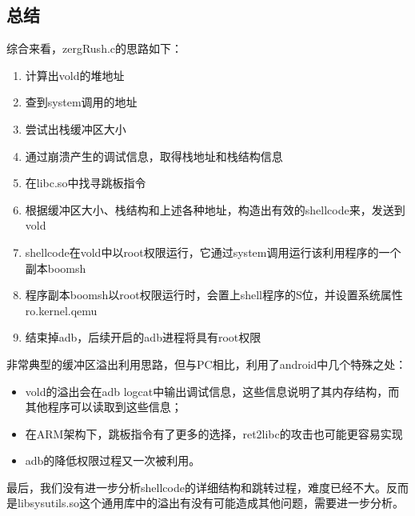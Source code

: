 \subsection{总结}

综合来看，zergRush.c的思路如下：
\begin{enumerate}
\item 计算出vold的堆地址
\item 查到system调用的地址
\item 尝试出栈缓冲区大小
\item 通过崩溃产生的调试信息，取得栈地址和栈结构信息
\item 在libc.so中找寻跳板指令
\item 根据缓冲区大小、栈结构和上述各种地址，构造出有效的shellcode来，发送到vold
\item shellcode在vold中以root权限运行，它通过system调用运行该利用程序的一个副本boomsh
\item 程序副本boomsh以root权限运行时，会置上shell程序的S位，并设置系统属性ro.kernel.qemu
\item 结束掉adb，后续开启的adb进程将具有root权限
\end{enumerate}

非常典型的缓冲区溢出利用思路，但与PC相比，利用了android中几个特殊之处：
\begin{itemize}
\item vold的溢出会在adb logcat中输出调试信息，这些信息说明了其内存结构，而其他程序可以读取到这些信息；
\item 在ARM架构下，跳板指令有了更多的选择，ret2libc的攻击也可能更容易实现
\item adb的降低权限过程又一次被利用。
\end{itemize}

最后，我们没有进一步分析shellcode的详细结构和跳转过程，难度已经不大。反而是libsysutils.so这个通用库中的溢出有没有可能造成其他问题，需要进一步分析。

